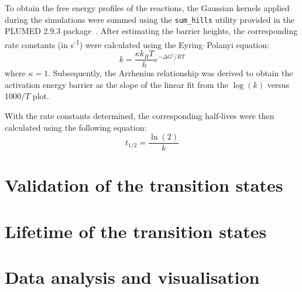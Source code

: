 To obtain the free energy profiles of the reactions, the Gaussian kernels applied during the simulations were summed using the \texttt{sum\_hills} utility provided in the PLUMED 2.9.3 package~\citep{tribelloPLUMED2New2014}. After estimating the barrier heights, the corresponding rate constants (in s\textsuperscript{-1}) were calculated using the Eyring–Polanyi equation:
\begin{equation}
    k = \frac{\kappa k_B T}{h} e^{-\Delta G^\ddagger / RT}
\end{equation}
where $\kappa = 1$. Subsequently, the Arrhenius relationship was derived to obtain the activation energy barrier as the slope of the linear fit from the \(\log(k)\) versus \(1000/T\) plot.

With the rate constants determined, the corresponding half-lives were then calculated using the following equation:
\begin{equation}
    t_{1/2} = \frac{\ln(2)}{k}
    \label{eq:half_life}
\end{equation}


\section{Validation of the transition states}


\section{Lifetime of the transition states}


\section{Data analysis and visualisation}